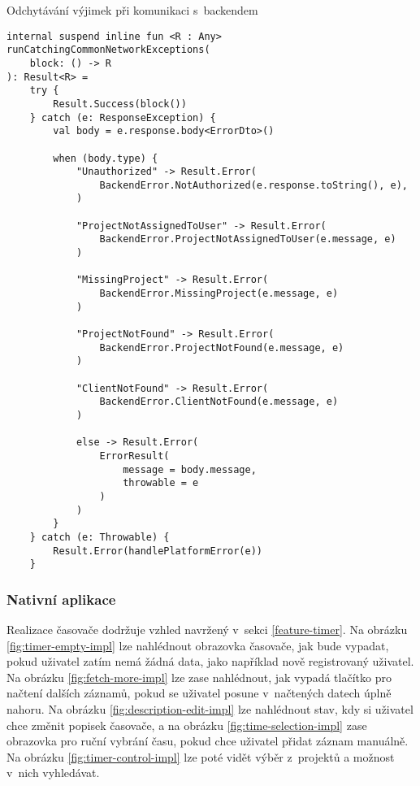 \begin{listing}
\caption{Odchytávání výjimek při komunikaci s~backendem}\label{code:kmp-run-catching-common-network-exceptions}
\begin{verbatim}
internal suspend inline fun <R : Any> runCatchingCommonNetworkExceptions(
    block: () -> R
): Result<R> =
    try {
        Result.Success(block())
    } catch (e: ResponseException) {
        val body = e.response.body<ErrorDto>()

        when (body.type) {
            "Unauthorized" -> Result.Error(
                BackendError.NotAuthorized(e.response.toString(), e),
            )

            "ProjectNotAssignedToUser" -> Result.Error(
                BackendError.ProjectNotAssignedToUser(e.message, e)
            )

            "MissingProject" -> Result.Error(
                BackendError.MissingProject(e.message, e)
            )

            "ProjectNotFound" -> Result.Error(
                BackendError.ProjectNotFound(e.message, e)
            )

            "ClientNotFound" -> Result.Error(
                BackendError.ClientNotFound(e.message, e)
            )

            else -> Result.Error(
                ErrorResult(
                    message = body.message,
                    throwable = e
                )
            )
        }
    } catch (e: Throwable) {
        Result.Error(handlePlatformError(e))
    }
\end{verbatim}
\end{listing}

\subsubsection{Nativní aplikace}

Realizace časovače dodržuje vzhled navržený v~sekci \ref{feature-timer}. Na obrázku \ref{fig:timer-empty-impl} lze nahlédnout obrazovka časovače, jak bude vypadat, pokud uživatel zatím nemá žádná data, jako například nově registrovaný uživatel. Na obrázku \ref{fig:fetch-more-impl} lze zase nahlédnout, jak vypadá tlačítko pro načtení dalších záznamů, pokud se uživatel posune v~načtených datech úplně nahoru. Na obrázku \ref{fig:description-edit-impl} lze nahlédnout stav, kdy si uživatel chce změnit popisek časovače, a na obrázku \ref{fig:time-selection-impl} zase obrazovka pro ruční vybrání času, pokud chce uživatel přidat záznam manuálně. Na obrázku \ref{fig:timer-control-impl} lze poté vidět výběr z~projektů a možnost v~nich vyhledávat.

